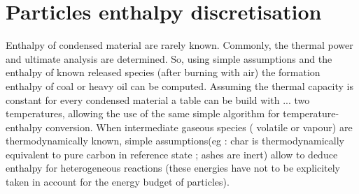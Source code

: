 \section{Particles enthalpy discretisation}

Enthalpy of condensed material are rarely known. Commonly, the thermal power and
ultimate analysis are determined. So, using simple assumptions and the enthalpy
of known released species ({\small after burning with air}) the formation
enthalpy of coal or heavy oil can be computed. Assuming the thermal capacity is
constant for every condensed material a table can be build with ... two
temperatures, allowing the use of the same simple algorithm for
temperature-enthalpy conversion. When intermediate gaseous species ({\small
volatile or vapour}) are thermodynamically known, simple assumptions({\small eg
: char is thermodynamically equivalent to pure carbon in reference state ; ashes
are inert}) allow to deduce enthalpy for heterogeneous reactions ({\small these
energies have not to be explicitely taken in account for the energy budget of
particles}).
